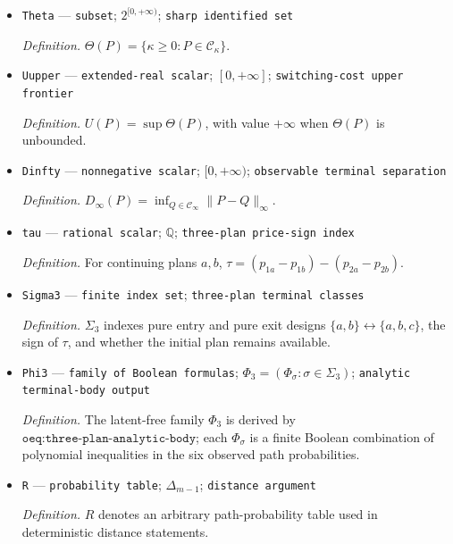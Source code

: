 \documentclass{article}
\begin{document}
\begin{itemize}
  \par\smallskip\noindent\emph{Definition.} \(\mathcal C_\infty=\operatorname{conv}\{v(q):q\in\Delta(F_\infty)\}\), where the maps \(r\), \(s\), and \(v\) are evaluated with \(F_\infty\) in place of \(F_\kappa\).
  \item \texttt{Theta} --- \texttt{subset}; \(2^{[0,+\infty)}\); \texttt{sharp identified set}
  \par\smallskip\noindent\emph{Definition.} \(\Theta(P)=\{\kappa\ge0:P\in\mathcal C_\kappa\}\).
  \item \texttt{Uupper} --- \texttt{extended-\allowbreak{}real scalar}; \([0,+\infty]\); \texttt{switching-\allowbreak{}cost upper frontier}
  \par\smallskip\noindent\emph{Definition.} \(U(P)=\sup\Theta(P)\), with value \(+\infty\) when \(\Theta(P)\) is unbounded.
  \item \texttt{Dinfty} --- \texttt{nonnegative scalar}; \([0,+\infty)\); \texttt{observable terminal separation}
  \par\smallskip\noindent\emph{Definition.} \(D_\infty(P)=\inf_{Q\in\mathcal C_\infty}\|P-Q\|_\infty\).
  \item \texttt{tau} --- \texttt{rational scalar}; \(\mathbb Q\); \texttt{three-\allowbreak{}plan price-\allowbreak{}sign index}
  \par\smallskip\noindent\emph{Definition.} For continuing plans \(a,b\), \(\tau=(p_{1a}-p_{1b})-(p_{2a}-p_{2b})\).
  \item \texttt{Sigma3} --- \texttt{finite index set}; \texttt{three-\allowbreak{}plan terminal classes}
  \par\smallskip\noindent\emph{Definition.} \(\Sigma_3\) indexes pure entry and pure exit designs \(\{a,b\}\leftrightarrow\{a,b,c\}\), the sign of \(\tau\), and whether the initial plan remains available.
  \item \texttt{Phi3} --- \texttt{family of Boolean formulas}; \(\Phi_3=(\Phi_\sigma:\sigma\in\Sigma_3)\); \texttt{analytic terminal-\allowbreak{}body output}
  \par\smallskip\noindent\emph{Definition.} The latent-free family \(\Phi_3\) is derived by \(\texttt{oeq:three-plan-analytic-body}\); each \(\Phi_\sigma\) is a finite Boolean combination of polynomial inequalities in the six observed path probabilities.
  \item \texttt{R} --- \texttt{probability table}; \(\Delta_{m-1}\); \texttt{distance argument}
  \par\smallskip\noindent\emph{Definition.} \(R\) denotes an arbitrary path-probability table used in deterministic distance statements.

\end{itemize}
\end{document}
